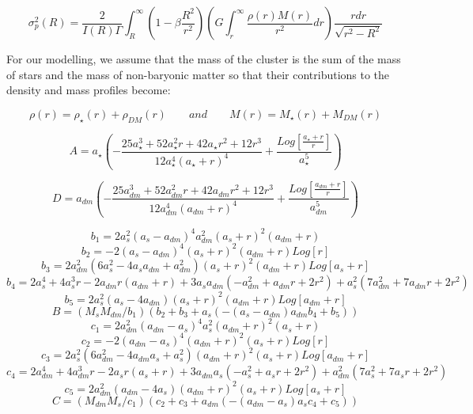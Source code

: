 \begin{equation}
\sigma_{p}^{2}(R)=\frac{2}{I(R)\Gamma}\int_{R}^{\infty}\left(1-\beta\frac{R^{2}}{r^{2}}\right)\left(G\int_{r}^{\infty}\frac{\rho(r)M(r)}{r^{2}}dr\right)\frac{rdr}{\sqrt{r^{2}-R^{2}}}
\end{equation}

For our modelling, we assume that the mass of the cluster is the sum of the mass of stars and the mass of non-baryonic matter so that their contributions to the density and mass profiles become:

\begin{equation}
\rho(r)=\rho_{\star}(r)+\rho_{DM}(r)\qquad and \qquad M(r)=M_{\star}(r)+M_{DM}(r)
\end{equation} 

\begin{equation}
A=a_{\star}\left(-\frac{25a_{\star}^{3}+52a_{\star}^{2}r+42a_{\star}r^{2}+12r^{3}}{12a_{\star}^{4}\left(a_{\star}+r\right)^{4}}+\frac{Log\left[\frac{a_{\star}+r}{r}\right]}{a_{\star}^{5}}\right)
\end{equation}

\begin{equation}
D=a_{dm}\left(-\frac{25a_{dm}^{3}+52a_{dm}^{2}r+42a_{dm}r^{2}+12r^{3}}{12a_{dm}^{4}\left(a_{dm}+r\right)^{4}}+\frac{Log\left[\frac{a_{dm}+r}{r}\right]}{a_{dm}^{5}}\right)
\end{equation}

\[
b_{1}=2a_{s}^{2}(a_{s}-a_{dm})^{4}a_{dm}^{2}(a_{s}+r)^{2}(a_{dm}+r)
\]
\[
b_{2}=-2\left(a_{s}-a_{dm}\right)^{4}\left(a_{s}+r\right)^{2}\left(a_{dm}+r\right)Log[r]
\]
\[
b_{3}=2a_{dm}^{2}\left(6a_{s}^{2}-4a_{s}a_{dm}+a_{dm}^{2}\right)\left(a_{s}+r\right)^{2}\left(a_{dm}+r\right)Log[a_{s}+r]
\]
\[
b_{4}=2a_{s}^{4}+4a_{s}^{3}r-2a_{dm}r(a_{dm}+r)+3a_{s}a_{dm}\left(-a_{dm}^{2}+a_{dm}r+2r^{2}\right)+a_{s}^{2}\left(7a_{dm}^{2}+7a_{dm}r+2r^{2}\right)
\]
\[
b_{5}=2a_{s}^{2}\left(a_{s}-4a_{dm}\right)\left(a_{s}+r\right)^{2}\left(a_{dm}+r\right)Log[a_{dm}+r]
\]
\[
B=\left(M_{s}M_{dm}/b_{1}\right)\left(b_{2}+b_{3}+a_{s}\left(-\left(a_{s}-a_{dm}\right)a_{dm}b_{4}+b_{5}\right)\right)
\]
\[
c_{1}=2a_{dm}^{2}(a_{dm}-a_{s})^{4}a_{s}^{2}(a_{dm}+r)^{2}(a_{s}+r)
\]
\[
c_{2}=-2\left(a_{dm}-a_{s}\right)^{4}\left(a_{dm}+r\right)^{2}\left(a_{s}+r\right)Log[r]
\]
\[
c_{3}=2a_{s}^{2}\left(6a_{dm}^{2}-4a_{dm}a_{s}+a_{s}^{2}\right)\left(a_{dm}+r\right)^{2}\left(a_{s}+r\right)Log[a_{dm}+r]
\]
\[
c_{4}=2a_{dm}^{4}+4a_{dm}^{3}r-2a_{s}r(a_{s}+r)+3a_{dm}a_{s}\left(-a_{s}^{2}+a_{s}r+2r^{2}\right)+a_{dm}^{2}\left(7a_{s}^{2}+7a_{s}r+2r^{2}\right)
\]
\[
c_{5}=2a_{dm}^{2}\left(a_{dm}-4a_{s}\right)\left(a_{dm}+r\right)^{2}\left(a_{s}+r\right)Log[a_{s}+r]
\]
\[
C=\left(M_{dm}M_{s}/c_{1}\right)\left(c_{2}+c_{3}+a_{dm}\left(-\left(a_{dm}-a_{s}\right)a_{s}c_{4}+c_{5}\right)\right)
\]

